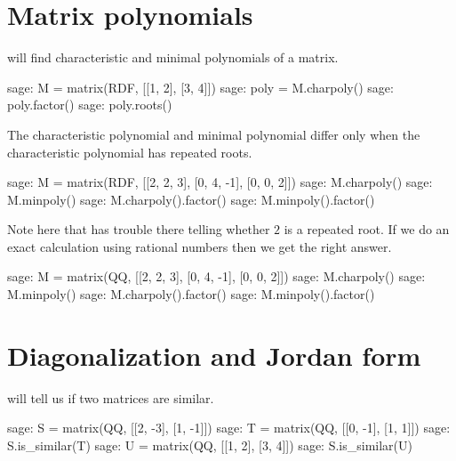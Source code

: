 



\section{Matrix polynomials}

\Sage{} will find characteristic and minimal polynomials of a matrix.
\begin{sagecommandline}
sage: M =  matrix(RDF, [[1, 2], [3, 4]]) 
sage: poly = M.charpoly()
sage: poly.factor()
sage: poly.roots()
\end{sagecommandline}

The characteristic polynomial and minimal polynomial differ only when 
the characteristic polynomial has repeated roots.
\begin{sagecommandline}
sage: M =  matrix(RDF, [[2, 2, 3], [0, 4, -1], [0, 0, 2]]) 
sage: M.charpoly()
sage: M.minpoly()
sage: M.charpoly().factor()
sage: M.minpoly().factor()
\end{sagecommandline}
\noindent
Note here that \Sage{} has trouble there telling whether $2$ is a repeated 
root.
If we do an exact calculation using 
rational numbers then we get the right answer.  
\begin{sagecommandline}
sage: M =  matrix(QQ, [[2, 2, 3], [0, 4, -1], [0, 0, 2]]) 
sage: M.charpoly()
sage: M.minpoly()
sage: M.charpoly().factor()
sage: M.minpoly().factor()
\end{sagecommandline}




\section{Diagonalization and Jordan form}

\Sage{} will tell us if two matrices are similar.
\begin{sagecommandline}
sage: S =  matrix(QQ, [[2, -3], [1, -1]]) 
sage: T =  matrix(QQ, [[0, -1], [1,  1]]) 
sage: S.is_similar(T)
sage: U =  matrix(QQ, [[1, 2], [3,  4]]) 
sage: S.is_similar(U)
\end{sagecommandline}
\noindent

